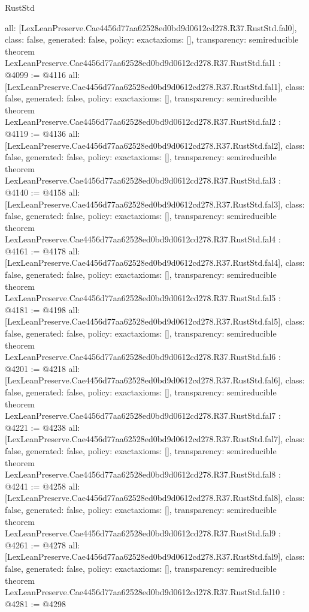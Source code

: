 \begin{lexlean}{RustStd}
\begin{coremodule}
{  all: [LexLeanPreserve.Cae4456d77aa62528ed0bd9d0612cd278.R37.RustStd.fal0],
  class: false,
  generated: false,
  policy: exact{axioms: []},
  transparency: semireducible
}
theorem LexLeanPreserve.Cae4456d77aa62528ed0bd9d0612cd278.R37.RustStd.fal1 : @4099 := @4116 {
  all: [LexLeanPreserve.Cae4456d77aa62528ed0bd9d0612cd278.R37.RustStd.fal1],
  class: false,
  generated: false,
  policy: exact{axioms: []},
  transparency: semireducible
}
theorem LexLeanPreserve.Cae4456d77aa62528ed0bd9d0612cd278.R37.RustStd.fal2 : @4119 := @4136 {
  all: [LexLeanPreserve.Cae4456d77aa62528ed0bd9d0612cd278.R37.RustStd.fal2],
  class: false,
  generated: false,
  policy: exact{axioms: []},
  transparency: semireducible
}
theorem LexLeanPreserve.Cae4456d77aa62528ed0bd9d0612cd278.R37.RustStd.fal3 : @4140 := @4158 {
  all: [LexLeanPreserve.Cae4456d77aa62528ed0bd9d0612cd278.R37.RustStd.fal3],
  class: false,
  generated: false,
  policy: exact{axioms: []},
  transparency: semireducible
}
theorem LexLeanPreserve.Cae4456d77aa62528ed0bd9d0612cd278.R37.RustStd.fal4 : @4161 := @4178 {
  all: [LexLeanPreserve.Cae4456d77aa62528ed0bd9d0612cd278.R37.RustStd.fal4],
  class: false,
  generated: false,
  policy: exact{axioms: []},
  transparency: semireducible
}
theorem LexLeanPreserve.Cae4456d77aa62528ed0bd9d0612cd278.R37.RustStd.fal5 : @4181 := @4198 {
  all: [LexLeanPreserve.Cae4456d77aa62528ed0bd9d0612cd278.R37.RustStd.fal5],
  class: false,
  generated: false,
  policy: exact{axioms: []},
  transparency: semireducible
}
theorem LexLeanPreserve.Cae4456d77aa62528ed0bd9d0612cd278.R37.RustStd.fal6 : @4201 := @4218 {
  all: [LexLeanPreserve.Cae4456d77aa62528ed0bd9d0612cd278.R37.RustStd.fal6],
  class: false,
  generated: false,
  policy: exact{axioms: []},
  transparency: semireducible
}
theorem LexLeanPreserve.Cae4456d77aa62528ed0bd9d0612cd278.R37.RustStd.fal7 : @4221 := @4238 {
  all: [LexLeanPreserve.Cae4456d77aa62528ed0bd9d0612cd278.R37.RustStd.fal7],
  class: false,
  generated: false,
  policy: exact{axioms: []},
  transparency: semireducible
}
theorem LexLeanPreserve.Cae4456d77aa62528ed0bd9d0612cd278.R37.RustStd.fal8 : @4241 := @4258 {
  all: [LexLeanPreserve.Cae4456d77aa62528ed0bd9d0612cd278.R37.RustStd.fal8],
  class: false,
  generated: false,
  policy: exact{axioms: []},
  transparency: semireducible
}
theorem LexLeanPreserve.Cae4456d77aa62528ed0bd9d0612cd278.R37.RustStd.fal9 : @4261 := @4278 {
  all: [LexLeanPreserve.Cae4456d77aa62528ed0bd9d0612cd278.R37.RustStd.fal9],
  class: false,
  generated: false,
  policy: exact{axioms: []},
  transparency: semireducible
}
theorem LexLeanPreserve.Cae4456d77aa62528ed0bd9d0612cd278.R37.RustStd.fal10 : @4281 := @4298 {
}
\end{coremodule}
\end{lexlean}
